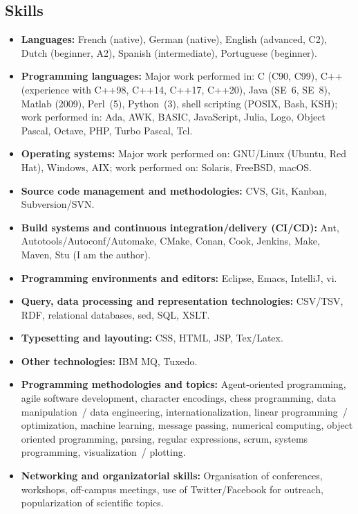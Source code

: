 \documentclass[line,mm]{res}
\newcounter{x}
\newcounter{y}
\newcounter{z}
\begin{document}
\begin{resume}
\section{Skills}
\begin{itemize}
  \item \textbf{Languages:}
    French (native), 
    German (native),
    English (advanced, C2), 
    Dutch (beginner, A2), 
    Spanish (intermediate), 
    Portuguese (beginner).  
  \item \textbf{Programming languages:}
    Major work performed in:  C (C90, C99), C++ (experience with C++98, C++14, C++17,
    C++20), Java (SE~6, SE~8), Matlab (2009), Perl~(5), Python~(3), shell
    scripting (POSIX, Bash, KSH);
    work performed in: Ada, AWK, BASIC, JavaScript, Julia, Logo, Object Pascal, Octave,
    PHP, Turbo Pascal, Tcl. 
  \item \textbf{Operating systems:}
    Major work performed on: GNU/Linux (Ubuntu, Red Hat), Windows, AIX; work
    performed on: Solaris, FreeBSD, macOS.  
  \item \textbf{Source code management and methodologies:}
    CVS, Git, Kanban, Subversion/SVN. 
  \item \textbf{Build systems and continuous integration/delivery (CI/CD):}
    Ant, Autotools/Autoconf/Automake, CMake, Conan, Cook, Jenkins, Make, Maven, Stu (I am
    the author).
  \item \textbf{Programming environments and editors:}
    Eclipse, Emacs, IntelliJ, vi.
  \item \textbf{Query, data processing and representation technologies:}
    CSV/TSV, RDF, relational databases, sed, SQL, XSLT. 
  \item \textbf{Typesetting and layouting:}
    CSS, HTML, JSP, Tex/Latex.
  \item \textbf{Other technologies:}
    IBM MQ, Tuxedo.
  \item \textbf{Programming methodologies and topics:}
    Agent-oriented programming,
    agile software development,
    character encodings,
    chess programming,
    data manipulation~/ data engineering,
    internationalization,
    linear programming~/ optimization,
    machine learning,
    message passing,
    numerical computing,
    object oriented programming,
    parsing, 
    regular expressions,
    scrum,
    systems programming, visualization~/ plotting. 
  \item \textbf{Networking and organizatorial skills:}
    Organisation of conferences, workshops, off-campus meetings,
    use of Twitter/Facebook for outreach, popularization of scientific topics. 

\end{itemize}
\end{resume}
\end{document}
